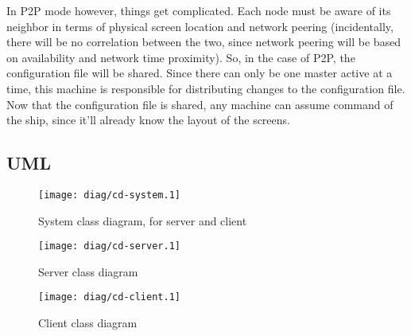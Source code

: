 In P2P mode however, things get complicated. Each node must be aware of its
neighbor in terms of physical screen location and network peering
(incidentally, there will be no correlation between the two, since network 
peering will be based on availability and network time proximity). So, in the
case of P2P, the configuration file will be shared. Since there can only be
one master active at a time, this machine is responsible for distributing
changes to the configuration file. Now that the configuration file is shared,
any machine can assume command of the ship, since it'll already know the layout
of the screens.

\clearpage
\subsection{UML}

\begin{figure}[ht!]
  \begin{center}
    \texttt{[image: diag/cd-system.1]}
    \caption{System class diagram, for server and client}
    \label{fig:systemClassDiagram}
  \end{center}
\end{figure}

\begin{figure}[ht!]
  \begin{center}
    \texttt{[image: diag/cd-server.1]}
    \caption{Server class diagram}
    \label{fig:serverClassDiagram}
  \end{center}
\end{figure}

\begin{figure}[ht!]
  \begin{center}
    \texttt{[image: diag/cd-client.1]}
    \caption{Client class diagram}
    \label{fig:clientClassDiagram}
  \end{center}
\end{figure}


